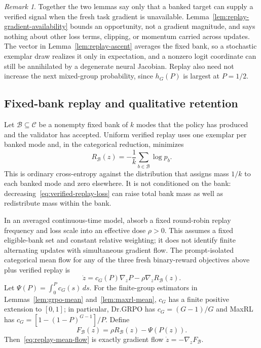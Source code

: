 \documentclass{article}
\newcommand{\1}{\mathbf 1}
\theoremstyle{remark}
\newtheorem{remark}[lemma]{Remark}
\theoremstyle{definition}
\theoremstyle{plain}
\begin{document}
\begin{remark}
Together the two lemmas say only that a banked target can supply a verified
signal when the fresh task gradient is unavailable. Lemma~\ref{lem:replay-gradient-availability}
bounds an opportunity, not a gradient magnitude, and says nothing about other
loss terms, clipping, or momentum carried across updates. The vector in
Lemma~\ref{lem:replay-ascent} averages the fixed bank, so a stochastic
exemplar draw realizes it only in expectation, and a nonzero logit coordinate
can still be annihilated by a degenerate neural Jacobian. Replay also need not
increase the next mixed-group probability, since $h_G(P)$ is largest at
$P=1/2$.
\end{remark}

\subsection{Fixed-bank replay and qualitative retention}
\label{app:theory-replay}

Let $\mathcal B\subseteq\mathcal C$ be a nonempty fixed bank of $k$ modes that
the policy has produced and the validator has accepted. Uniform verified replay
uses one exemplar per banked mode and, in the categorical reduction, minimizes
\begin{equation}
  R_{\mathcal B}(z)
  =-\frac1k\sum_{b\in\mathcal B}\log p_b.
  \label{eq:verified-replay-loss}
\end{equation}
This is ordinary cross-entropy against the distribution that assigns mass
$1/k$ to each banked mode and zero elsewhere. It is not conditioned on the
bank: decreasing~\eqref{eq:verified-replay-loss} can raise total bank mass as
well as redistribute mass within the bank.

In an averaged continuous-time model, absorb a fixed round-robin replay
frequency and loss scale into an effective dose $\rho>0$. This assumes a
fixed eligible-bank set and constant relative weighting; it does not identify
finite alternating updates with simultaneous gradient flow. The prompt-isolated categorical mean flow for any of the three fresh
binary-reward objectives above plus verified replay is
\begin{equation}
  \dot z
  =c_G(P)\nabla_zP-\rho\nabla_zR_{\mathcal B}(z).
  \label{eq:replay-mean-flow}
\end{equation}
Let $\Psi(P)=\int_0^P c_G(s)\,ds$. For the finite-group estimators in Lemmas~\ref{lem:grpo-mean}
and~\ref{lem:maxrl-mean}, $c_G$ has a finite positive extension to $[0,1]$;
in particular, Dr.GRPO has $c_G=(G-1)/G$ and MaxRL has
$c_G=[1-(1-P)^{G-1}]/P$. Define
\begin{equation}
  F_{\mathcal B}(z)=\rho R_{\mathcal B}(z)-\Psi(P(z)).
  \label{eq:replay-potential}
\end{equation}
Then~\eqref{eq:replay-mean-flow} is exactly gradient flow
$\dot z=-\nabla_zF_{\mathcal B}$.
\end{document}
